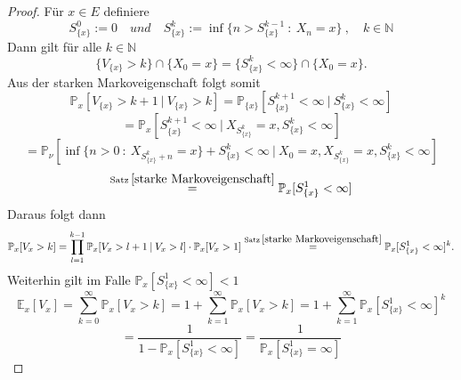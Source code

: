 \documentclass[a4paper,12pt]{scrartcl}
\theoremstyle{definition}
\begin{document}
\begin{proof}
Für $x \in E$ definiere 
\begin{equation*}
S_{\lbrace x \rbrace}^{0} := 0 \quad und \quad S_{\lbrace x \rbrace}^{k} := \inf \lbrace n > S_{\lbrace x \rbrace}^{k-1} \: : \: X_{n} = x \rbrace \: , \quad k \in \mathbb{N}
\end{equation*}
Dann gilt für alle $k \in \mathbb{N}$
\begin{equation*}
\lbrace V_{ \lbrace x \rbrace} > k \rbrace \cap \lbrace X_{0} = x \rbrace = \lbrace S_{\lbrace x \rbrace}^{k} < \infty \rbrace \cap \lbrace X_{0} = x \rbrace .
\end{equation*}
Aus der starken Markoveigenschaft folgt somit
\begin{equation*}
\mathbb{P}_{x}[V_{ \lbrace x \rbrace} > k+1 \: | \: V_{ \lbrace x \rbrace} > k] = \mathbb{P}_{\lbrace x \rbrace}[S_{\lbrace x \rbrace}^{k+1} < \infty \: | \: S_{\lbrace x \rbrace}^{k} < \infty] 
\end{equation*}
\begin{equation*}
= \mathbb{P}_{x}[S_{\lbrace x \rbrace}^{k+1} < \infty \: | \: X_{S_{\lbrace x \rbrace}^{k}} = x, S_{\lbrace x \rbrace}^{k} < \infty]
\end{equation*}
\begin{equation*}
= \mathbb{P}_{\nu}[\inf \lbrace n>0 \: : \: X_{S_{\lbrace x \rbrace}^{k} + n} = x \rbrace + S_{\lbrace x \rbrace}^{k} < \infty  \: | \: X_{0} = x,X_{S_{\lbrace x \rbrace}^{k}} = x, S_{\lbrace x \rbrace}^{k} < \infty]
\end{equation*}
\begin{equation*}
\stackrel{\mathrm{Satz} \: \ref{starke Markoveigenschaft}}{=} \mathbb{P}_{x}[S_{\lbrace x \rbrace}^{1} < \infty]
\end{equation*}
Daraus folgt dann
\begin{equation*}
\mathbb{P}_{x}[V_{x} > k] = \prod_{l=1}^{k-1} \mathbb{P}_{x}[V_{x} > l + 1 \: | \: V_{x} > l] \cdot \mathbb{P}_{x}[V_{x} > 1] \stackrel{\mathrm{Satz} \: \ref{starke Markoveigenschaft}}{=} \mathbb{P}_{x}[S_{\lbrace x \rbrace}^{1} < \infty]^{k}.
\end{equation*}
Weiterhin gilt im Falle $\mathbb{P}_{x}[S_{\lbrace x \rbrace}^{1} < \infty] < 1$
\begin{equation*}
\mathbb{E}_{x}[V_{x}] = \sum_{k=0}^{\infty}\mathbb{P}_{x}[V_{x} > k] = 1 + \sum_{k=1}^{\infty}\mathbb{P}_{x}[V_{x} > k] = 1 + \sum_{k=1}^{\infty}\mathbb{P}_{x}[S_{\lbrace x \rbrace}^{1} < \infty]^{k}
\end{equation*}
\begin{equation*}
= \dfrac{1}{1-\mathbb{P}_{x}[S_{\lbrace x \rbrace}^{1} < \infty]} = \dfrac{1}{\mathbb{P}_{x}[S_{\lbrace x \rbrace}^{1} = \infty]}
\end{equation*}
\end{proof}
\vspace{15cm}
\end{document}

